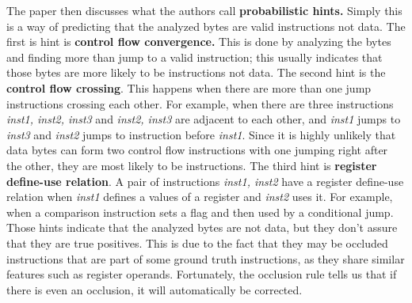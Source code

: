\documentclass{article}
\begin{document}
\noindent The paper then discusses what the authors call \textbf{probabilistic hints.} Simply this is a way of predicting that the analyzed bytes are valid instructions not data. The first is hint is \textbf{control flow convergence.} This is done by analyzing the bytes and finding more than jump to a valid instruction; this usually indicates that those bytes are more likely to be instructions not data. The second hint is the \textbf{control flow crossing}. This happens when there are more than one jump instructions crossing each other. For example, when there are three instructions \emph{inst1, inst2, inst3} and \emph{inst2, inst3} are adjacent to each other, and \emph{inst1} jumps to \emph{inst3} and \emph{inst2} jumps to instruction before \emph{inst1}. Since it is highly unlikely that data bytes can form two control flow instructions with one jumping right after the other, they are most likely to be instructions. The third hint is \textbf{register define-use relation}. A pair of instructions \emph{inst1, inst2} have a register define-use relation when \emph{inst1} defines a values of a register and \emph{inst2} uses it. For example, when a comparison instruction sets a flag and then used by a conditional jump. Those hints indicate that the analyzed bytes are not data, but they don't assure that they are true positives. This is due to the fact that they may be occluded instructions that are part of some ground truth instructions, as they share similar features such as register operands. Fortunately, the occlusion rule tells us that if there is even an occlusion, it will automatically be corrected.
\end{document}
